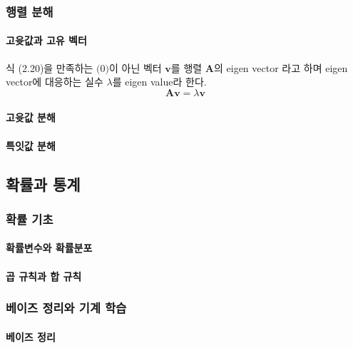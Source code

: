 \documentclass [12pt] {oblivoir}
\let\oldsubsubsection=\subsubsection
\renewcommand{\subsubsection}
{
  \filbreak
  \oldsubsubsection
}
\begin{document}
\subsubsection{행렬 분해}

\paragraph*{고윳값과 고유 벡터}\mbox{}

식 (2.20)을 만족하는 $\mathbf(0)$이 아닌 벡터 $\mathbf{v}$를 행렬 $\mathbf{A}$의 eigen vector 라고 하며 eigen vector에 대응하는 실수 $\lambda$를 eigen value라 한다.
\begin{equation} \tag{2.20}
  \mathbf{Av} = \lambda\mathbf{v}
\end{equation}

\paragraph*{고윳값 분해}\mbox{}

\paragraph*{특잇값 분해}\mbox{}

\subsection{확률과 통계}

\subsubsection{확률 기초}

\paragraph*{확률변수와 확률분포}\mbox{}

\paragraph*{곱 규칙과 합 규칙}\mbox{}

\subsubsection{베이즈 정리와 기계 학습}

\paragraph*{베이즈 정리}\mbox{}
\end{document}
